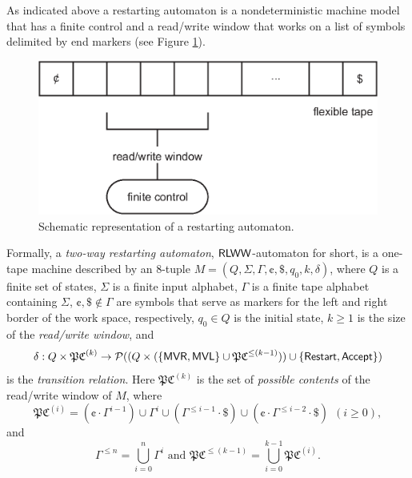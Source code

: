 As indicated above a restarting automaton is a nondeterministic machine model that has a finite control and a read/write window that works on a list of symbols delimited by end markers (see Figure \ref{figure:restarting_automaton}).

\begin{figure}[htp]
\centering
\includegraphics[scale=1.0]{img/restarting_automaton.eps}
\caption[Schematic representation of a restarting automaton.]
{Schematic representation of a restarting automaton.}
\label{figure:restarting_automaton}
\end{figure}

Formally, a \emph{two-way restarting automaton}, $\textup{\sf RLWW}$-automaton for short, is a one-tape machine described by an $8$-tuple $M = (Q, \Sigma, \Gamma, \cent, \$, q_0, k, \delta)$, where $Q$ is a finite set of states, $\Sigma$ is a finite input alphabet, $\Gamma$ is a finite tape alphabet containing $\Sigma$, $\cent, \$ \notin \Gamma$ are symbols that serve as markers for the left and right border of the work space, respectively, $q_0 \in Q$ is the initial state, $k \ge 1$ is the size of the \emph{read/write window}, and $$\delta: Q \times \mathfrak{PC}^{(k)} \to \mathcal{P}((Q \times (\{\textup{\sf MVR}, \textup{\sf MVL}\} \cup \mathfrak{PC}^{\le (k-1)})) \cup \{\textup{\sf Restart}, \textup{\sf Accept}\})$$ is the \emph{transition relation}. Here $\mathfrak{PC}^{(k)}$ is the set of \emph{possible contents} of the read/write window of $M$, where $$\mathfrak{PC}^{(i)} = (\cent \cdot \Gamma^{i-1}) \cup \Gamma^i \cup (\Gamma^{\le i-1} \cdot \$) \cup (\cent \cdot \Gamma^{\le i-2} \cdot \$)\ \ (i \ge 0),$$ and $$\Gamma^{\le n} = \bigcup_{i=0}^n \Gamma^i \text{ and } \mathfrak{PC}^{\le (k-1)} = \bigcup_{i=0}^{k-1}\mathfrak{PC}^{(i)}.$$


